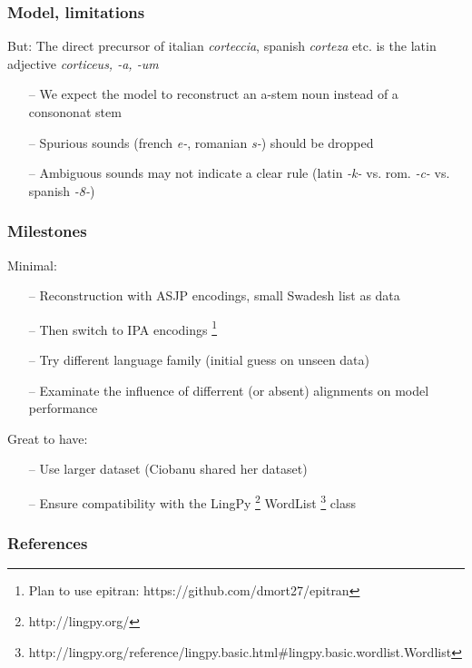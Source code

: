 \documentclass[11pt]{beamer}
\begin{document}
\begin{frame}
    \frametitle{Model, limitations}
    But: The direct precursor of italian \textit{corteccia}, spanish \textit{corteza} etc. is the latin adjective \textit{corticeus, -a, -um}
    \begin{itemize}
        \item[--] We expect the model to reconstruct an a-stem noun instead of a consononat stem 
        \item[--] Spurious sounds (french \textit{e-}, romanian \textit{s-}) should be dropped
        \item[--] Ambiguous sounds may not indicate a clear rule (latin \textit{-k-} vs. rom. \textit{-c-} vs. spanish \textit{-8-})  
    \end{itemize}
\end{frame}

\begin{frame}
    \frametitle{Milestones}
    Minimal:
    \begin{itemize}
        \item[--] Reconstruction with ASJP encodings, small Swadesh list as data 
        \item[--] Then switch to IPA encodings \footnote{Plan to use epitran: https://github.com/dmort27/epitran}
        \item[--] Try different language family (initial guess on unseen data)
        \item[--] Examinate the influence of differrent (or absent) alignments on model performance  
    \end{itemize}    
    Great to have:
    \begin{itemize}
        \item[--] Use larger dataset (Ciobanu shared her dataset)
        \item[--] Ensure compatibility with the LingPy \footnote{http://lingpy.org/} WordList 
        \footnote{http://lingpy.org/reference/lingpy.basic.html\#lingpy.basic.wordlist.Wordlist} class
    \end{itemize}
\end{frame}

\begin{frame}
    \frametitle{References}
    
\end{frame}
\end{document}
